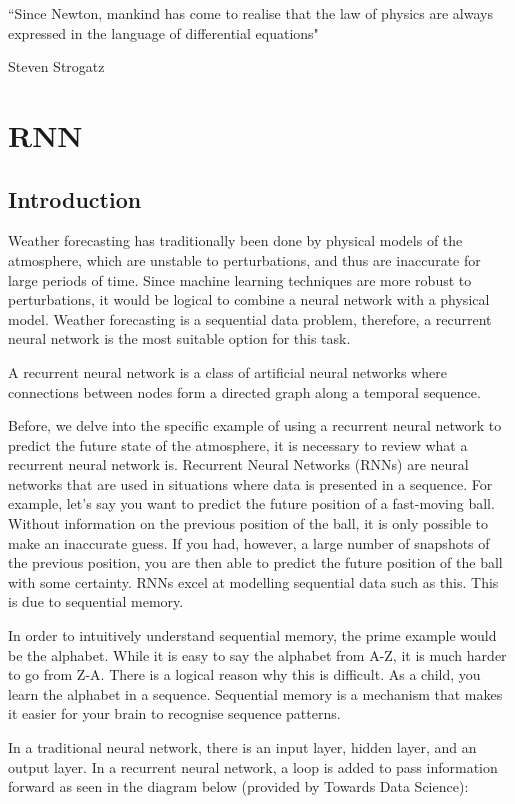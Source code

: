 \epigraph{``Since Newton, mankind has come to realise that the law of physics are always expressed in the language of differential equations"}{Steven Strogatz}

\section{RNN}
\subsection{Introduction}
Weather forecasting has traditionally been done by physical models of the atmosphere, which are unstable to perturbations, and thus are inaccurate for large periods of time\cite{why_rnn}. Since machine learning techniques are more robust to perturbations, it would be logical to combine a neural network with a physical model. Weather forecasting is a sequential data problem, therefore, a recurrent neural network is the most suitable option for this task. 

\begin{definition}
A recurrent neural network is a class of artificial neural networks where connections between nodes form a directed graph along a temporal sequence.
\end{definition}

Before, we delve into the specific example of using a recurrent neural network to predict the future state of the atmosphere, it is necessary to review what a recurrent neural network is. Recurrent Neural Networks (RNNs) are neural networks that are used in situations where data is presented in a sequence. For example, let's say you want to predict the future position of a fast-moving ball. Without information on the previous position of the ball, it is only possible to make an inaccurate guess. If you had, however, a large number of snapshots of the previous position, you are then able to predict the future position of the ball with some certainty. RNNs excel at modelling sequential data such as this. This is due to sequential memory.

In order to intuitively understand sequential memory, the prime example would be the alphabet. While it is easy to say the alphabet from A-Z, it is much harder to go from Z-A. There is a logical reason why this is difficult. As a child, you learn the alphabet in a sequence. Sequential memory is a mechanism that makes it easier for your brain to recognise sequence patterns.

In a traditional neural network, there is an input layer, hidden layer, and an output layer. In a recurrent neural network, a loop is added to pass information forward as seen in the diagram below (provided by Towards Data Science)\cite{intro_rnn}:

